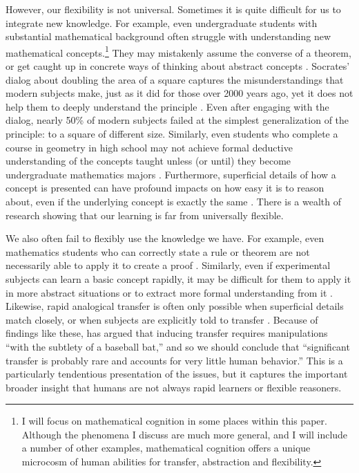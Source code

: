However, our flexibility is not universal. Sometimes it is quite difficult for us to integrate new knowledge. For example, even undergraduate students with substantial mathematical background often struggle with understanding new mathematical concepts.\footnote{I will focus on mathematical cognition in some places within this paper. Although the phenomena I discuss are much more general, and I will include a number of other examples, mathematical cognition offers a unique microcosm of human abilities for transfer, abstraction and flexibility.} They may mistakenly assume the converse of a theorem, or get caught up in concrete ways of thinking about abstract concepts \citep{Hazzan1999}. Socrates' dialog about doubling the area of a square captures the misunderstandings that modern subjects make, just as it did for those over 2000 years ago, yet it does not help them to deeply understand the principle \citep{Goldin2011}. Even after engaging with the dialog, nearly 50\% of modern subjects failed at the simplest generalization of the principle: to a square of different size. Similarly, even students who complete a course in geometry in high school may not achieve formal deductive understanding of the concepts taught unless (or until) they become undergraduate mathematics majors \citep{Burger1986}. Furthermore, superficial details of how a concept is presented can have profound impacts on how easy it is to reason about, even if the underlying concept is exactly the same \citep[e.g.][]{Kotovsky1985, Kaminski2008, Lampinen2017b}. There is a wealth of research showing that our learning is far from universally flexible. \par 
We also often fail to flexibly use the knowledge we have. For example, even mathematics students who can correctly state a rule or theorem are not necessarily able to apply it to create a proof \citep{Weber2001}. Similarly, even if experimental subjects can learn a basic concept rapidly, it may be difficult for them to apply it in more abstract situations or to extract more formal understanding from it \citep[e.g.][]{Lampinen2017b}. Likewise, rapid analogical transfer is often only possible when superficial details match closely, or when subjects are explicitly told to transfer \citep[e.g.][]{Gick1980}. Because of findings like these, \citet{Detterman1993} has argued that inducing transfer requires manipulations ``with the subtlety of a baseball bat,'' and so we should conclude that ``significant transfer is probably rare and accounts for very little human behavior.'' This is a particularly tendentious presentation of the issues, but it captures the important broader insight that humans are not always rapid learners or flexible reasoners. \par 

